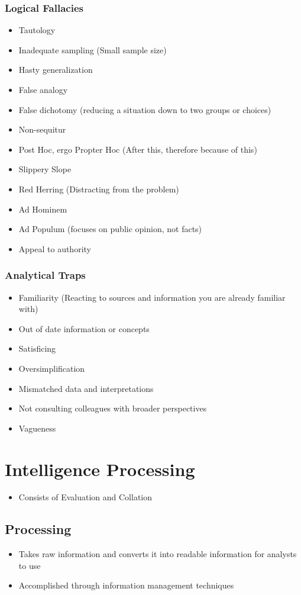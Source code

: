 \documentclass[11pt]{article}
\begin{document}
\subsubsection{Logical Fallacies}
\label{sec:orgec2d25b}
\begin{itemize}
\item Tautology
\item Inadequate sampling (Small sample size)
\item Hasty generalization
\item False analogy
\item False dichotomy  (reducing a situation down to two groups or choices)
\item Non-sequitur
\item Post Hoc, ergo Propter Hoc (After this, therefore because of this)
\item Slippery Slope
\item Red Herring (Distracting from the problem)
\item Ad Hominem
\item Ad Populum (focuses on public opinion, not facts)
\item Appeal to authority
\end{itemize}
\subsubsection{Analytical Traps}
\label{sec:org2f1d5d5}
\begin{itemize}
\item Familiarity (Reacting to sources and information you are already familiar with)
\item Out of date information or concepts
\item Satisficing
\item Oversimplification
\item Mismatched data and interpretations
\item Not consulting colleagues with broader perspectives
\item Vagueness
\end{itemize}
\section{Intelligence Processing}
\label{sec:org138e849}
\begin{itemize}
\item Consists of Evaluation and Collation
\end{itemize}
\subsection{Processing}
\label{sec:org82c0c65}
\begin{itemize}
\item Takes raw information and converts it into readable information for analysts to use
\item Accomplished through information management techniques
\end{itemize}
\end{document}

